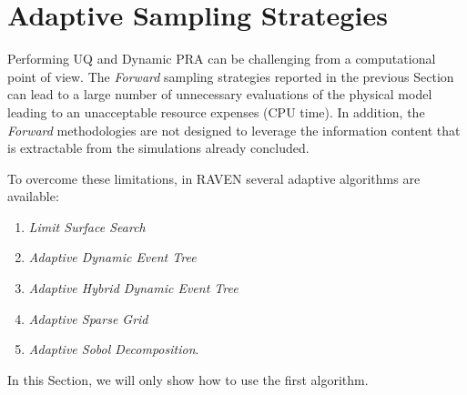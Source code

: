 \section{Adaptive Sampling Strategies}
\label{sec:adaptiveSamplingStrategies}
Performing UQ and Dynamic PRA can be
challenging from a computational point of view. The \textit{Forward}
sampling strategies reported in the previous Section can lead to a large number of
unnecessary evaluations of the physical model leading to an unacceptable resource expenses (CPU time).
In addition, the \textit{Forward} methodologies are not designed to leverage the information
content that is extractable from the simulations already concluded.

To overcome these limitations, in RAVEN several adaptive algorithms are available:
\begin{enumerate}
  \item \textit{Limit Surface Search}
  \item \textit{Adaptive Dynamic Event Tree}
  \item \textit{Adaptive Hybrid Dynamic Event Tree}
  \item \textit{Adaptive Sparse Grid}
  \item \textit{Adaptive Sobol Decomposition}.
\end{enumerate}
In this Section, we will only show how to use the first algorithm.

